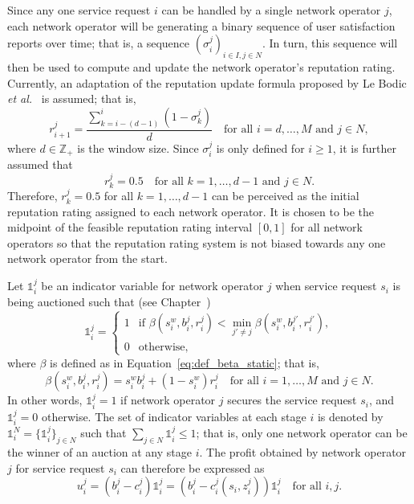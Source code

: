 Since any one service request $i$ can be handled by a single network operator $j$, each network operator will be generating a binary sequence of user satisfaction reports over time; that is, a sequence $(\sigma^j_i)_{i\in I,j\in N}$. In turn, this sequence will then be used to compute and update the network operator's reputation rating. Currently, an adaptation of the reputation update formula proposed by Le Bodic \emph{et al.}~\cite{DMLeBodic00} is assumed; that is,
\begin{equation}
  \label{eq:def_rep_update_lebodic_dynamic}
  r^j_{i+1} = \frac{\displaystyle\sum_{k=i-(d-1)}^{i}{(1-\sigma^j_k)}}{d} \quad\text{for all }i=d,\ldots,M \text{ and }j\in N,
\end{equation}
where $d\in \mathbb{Z}_+$ is the window size. Since $\sigma^j_i$ is only defined for $i\ge 1$, it is further assumed that
\begin{equation*}
  r^j_k = 0.5 \quad\text{for all }k=1,\ldots,d-1\text{ and }j\in N.
\end{equation*}
Therefore, $r^j_k=0.5$ for all $k=1,\ldots,d-1$ can be perceived as the initial reputation rating assigned to each network operator. It is chosen to be the midpoint of the feasible reputation rating interval $[0,1]$ for all network operators so that the reputation rating system is not biased towards any one network operator from the start.

Let $\mathds{1}^j_i$ be an indicator variable for network operator $j$ when service request $s_i$ is being auctioned such that (see Chapter~)
\begin{equation}
  \label{eq:indicator_function_dynamic}
  \mathds{1}^j_i = \left\{
  \begin{array}{ll}
    1 &\text{if } \beta(s^w_i,b^j_i,r^j_i) < \displaystyle\min_{j'\neq j} \beta(s^w_i,b^{j'}_i,r^{j'}_i),\\
    0 &\text{otherwise},
  \end{array}\right.
\end{equation}
where $\beta$ is defined as in Equation~\eqref{eq:def_beta_static}; that is,
\begin{equation}
  \label{eq:def_beta_dynamic}
  \beta(s^w_i,b^j_i,r^j_i) = s^w_i b^j_i + (1-s^w_i) r^j_i \quad\text{for all } i=1,\ldots,M \text{ and }j\in N.
\end{equation}
In other words, $\mathds{1}^j_i = 1$ if network operator $j$ secures the service request $s_i$, and $\mathds{1}^j_i = 0$ otherwise. The set of indicator variables at each stage $i$ is denoted by $\mathds{1}^N_i=\{\mathds{1}^j_i\}_{j\in N}$ such that $\sum_{j\in N}\mathds{1}^j_i\le 1$; that is, only one network operator can be the winner of an auction at any stage $i$. The profit obtained by network operator $j$ for service request $s_i$ can therefore be expressed as
\begin{equation}
  \label{eq:def_no_profit_dynamic}
  u^j_i = \left(b^j_i - c^j_i\right)\mathds{1}^j_i = \left(b^j_i - c^j_i(s_i, z^j_i)\right)\mathds{1}^j_i \quad\text{for all }i,j.
\end{equation}


